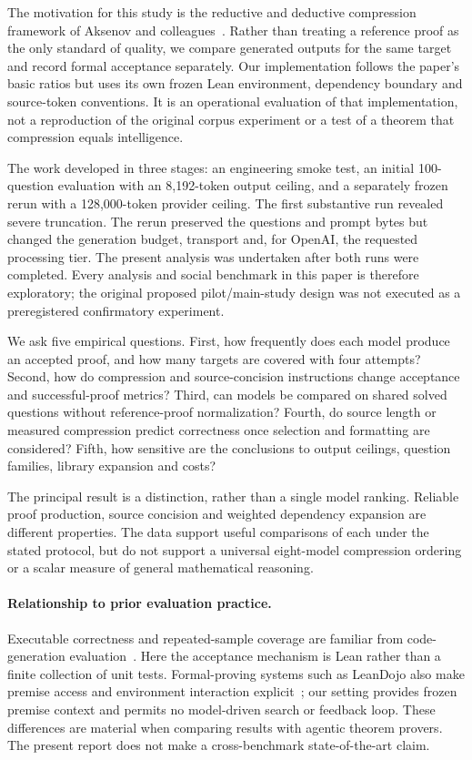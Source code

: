\documentclass[11pt]{article}
\begin{document}
The motivation for this study is the reductive and deductive compression framework of Aksenov and colleagues~\cite{compression}. Rather than treating a reference proof as the only standard of quality, we compare generated outputs for the same target and record formal acceptance separately. Our implementation follows the paper's basic ratios but uses its own frozen Lean environment, dependency boundary and source-token conventions. It is an operational evaluation of that implementation, not a reproduction of the original corpus experiment or a test of a theorem that compression equals intelligence.

The work developed in three stages: an engineering smoke test, an initial 100-question evaluation with an 8,192-token output ceiling, and a separately frozen rerun with a 128,000-token provider ceiling. The first substantive run revealed severe truncation. The rerun preserved the questions and prompt bytes but changed the generation budget, transport and, for OpenAI, the requested processing tier. The present analysis was undertaken after both runs were completed. Every analysis and social benchmark in this paper is therefore exploratory; the original proposed pilot/main-study design was not executed as a preregistered confirmatory experiment.

We ask five empirical questions. First, how frequently does each model produce an accepted proof, and how many targets are covered with four attempts? Second, how do compression and source-concision instructions change acceptance and successful-proof metrics? Third, can models be compared on shared solved questions without reference-proof normalization? Fourth, do source length or measured compression predict correctness once selection and formatting are considered? Fifth, how sensitive are the conclusions to output ceilings, question families, library expansion and costs?

The principal result is a distinction, rather than a single model ranking. Reliable proof production, source concision and weighted dependency expansion are different properties. The data support useful comparisons of each under the stated protocol, but do not support a universal eight-model compression ordering or a scalar measure of general mathematical reasoning.

\paragraph{Relationship to prior evaluation practice.}
Executable correctness and repeated-sample coverage are familiar from code-generation evaluation~\cite{humaneval}. Here the acceptance mechanism is Lean rather than a finite collection of unit tests. Formal-proving systems such as LeanDojo also make premise access and environment interaction explicit~\cite{leandojo}; our setting provides frozen premise context and permits no model-driven search or feedback loop. These differences are material when comparing results with agentic theorem provers. The present report does not make a cross-benchmark state-of-the-art claim.
\end{document}
